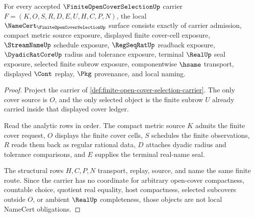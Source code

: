 \begin{theorem}
\label{thm:finite-open-cover-selection-namecert-obligations}
For every accepted $\FiniteOpenCoverSelectionUp$ carrier $F=(K,O,S,R,D,E,U,H,C,P,N)$, the local $\NameCert_{\FiniteOpenCoverSelectionUp}$ surface consists exactly of carrier admission, compact metric source exposure, displayed finite cover-cell exposure, $\StreamNameUp$ schedule exposure, $\RegSeqRatUp$ readback exposure, $\DyadicRatCoreUp$ radius and tolerance exposure, terminal $\RealUp$ seal exposure, selected finite subrow exposure, componentwise $\hsame$ transport, displayed $\Cont$ replay, $\Pkg$ provenance, and local naming.
\end{theorem}
\begin{proof}
Project the carrier of \autoref{def:finite-open-cover-selection-carrier}. The only cover source is $O$, and the only selected object is the finite subrow $U$ already carried inside that displayed cover ledger.

Read the analytic rows in order. The compact metric source $K$ admits the finite cover request, $O$ displays the finite cover cells, $S$ schedules the finite observations, $R$ reads them back as regular rational data, $D$ attaches dyadic radius and tolerance comparisons, and $E$ supplies the terminal real-name seal.

The structural rows $H,C,P,N$ transport, replay, source, and name the same finite route. Since the carrier has no coordinate for arbitrary open-cover compactness, countable choice, quotient real equality, host compactness, selected subcovers outside $O$, or ambient $\RealUp$ completeness, those objects are not local NameCert obligations.
\end{proof}

